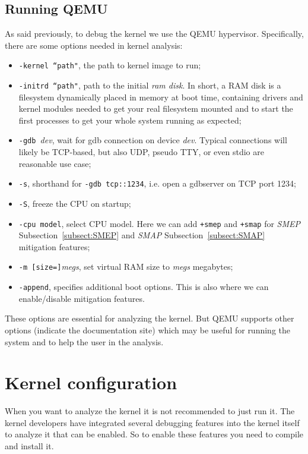 \documentclass{masterthesis}
\newcommand{\refToSubSection}[1]{Subsection~\ref{subsect:#1}\xspace}
\begin{document}
\subsection{Running QEMU}
\label{subsect:QEMU}
As said previously, to debug the kernel we use the QEMU hypervisor. Specifically, there are some options needed in kernel analysis:
\begin{itemize}
\item \texttt{-kernel  ``path"}, the path to kernel image to run;
\item \texttt{-initrd ``path"}, path to the initial \emph{ram disk}. In short, a RAM disk is a filesystem dynamically placed in memory at boot time, containing drivers and kernel modules needed to get your real filesystem mounted and to start the first processes to get your whole system running as expected;
\item \texttt{-gdb }\textit{dev}, wait for gdb connection on device \textit{dev}. Typical connections will likely be TCP-based, but also UDP, pseudo TTY, or even stdio are reasonable use case;
\item \texttt{-s}, shorthand for \texttt{-gdb tcp::1234}, i.e. open a gdbserver on TCP port 1234;
\item \texttt{-S}, freeze the CPU on startup;
\item \texttt{-cpu model}, select CPU model. Here we can add \texttt{+smep} and \texttt{+smap} for \emph{SMEP} \refToSubSection{SMEP} and \emph{SMAP} \refToSubSection{SMAP} mitigation features;
\item \texttt{-m [size=]}\textit{megs}, set virtual RAM size to \textit{megs} megabytes;
\item \texttt{-append}, specifies additional boot options. This is also where we can enable/disable mitigation features.
\end{itemize}
These options are essential for analyzing the kernel. But QEMU supports other options (indicate the documentation site) which may be useful for running the system and to help the user in the analysis.
\section{Kernel configuration}
\label{sect:configuration}
When you want to analyze the kernel it is not recommended to just run it. The kernel developers have integrated several debugging features into the kernel itself to analyze it that can be enabled.
So to enable these features you need to compile and install it.
\end{document}
